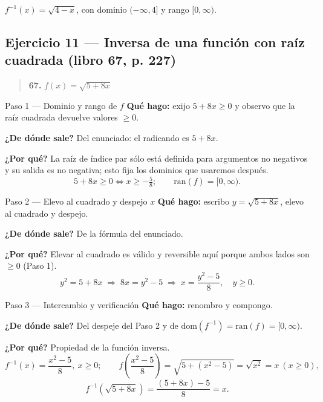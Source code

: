\documentclass[11pt]{article}
\begin{document}
\begin{resp}
$f^{-1}(x)=\sqrt{4-x}$, con dominio $(-\infty,4]$ y rango $[0,\infty)$.
\end{resp}

\subsection*{Ejercicio 11 --- Inversa de una función con raíz cuadrada (libro 67, p. 227)}

\begin{quote}
\textbf{67.} $f(x)=\sqrt{5+8x}$
\end{quote}

\begin{paso}{Paso 1 --- Dominio y rango de $f$}
\textbf{Qué hago:} exijo $5+8x\ge 0$ y observo que la raíz cuadrada devuelve valores $\ge 0$.

\textbf{¿De dónde sale?} Del enunciado: el radicando es $5+8x$.

\textbf{¿Por qué?} La raíz de índice par sólo está definida para argumentos no negativos y su salida es no negativa; esto fija los dominios que usaremos después.
\[
5+8x\ge 0 \iff x\ge -\tfrac{5}{8}; \qquad \text{ran}(f)=[0,\infty).
\]
\end{paso}

\begin{paso}{Paso 2 --- Elevo al cuadrado y despejo $x$}
\textbf{Qué hago:} escribo $y=\sqrt{5+8x}$, elevo al cuadrado y despejo.

\textbf{¿De dónde sale?} De la fórmula del enunciado.

\textbf{¿Por qué?} Elevar al cuadrado es válido y reversible aquí porque ambos lados son $\ge 0$ (Paso 1).
\[
y^2=5+8x \;\Longrightarrow\; 8x=y^2-5 \;\Longrightarrow\; x=\frac{y^2-5}{8}, \quad y\ge 0.
\]
\end{paso}

\begin{paso}{Paso 3 --- Intercambio y verificación}
\textbf{Qué hago:} renombro y compongo.

\textbf{¿De dónde sale?} Del despeje del Paso 2 y de $\text{dom}(f^{-1})=\text{ran}(f)=[0,\infty)$.

\textbf{¿Por qué?} Propiedad de la función inversa.
\[
f^{-1}(x)=\frac{x^2-5}{8}, \ x\ge 0; \qquad
f\!\left(\frac{x^2-5}{8}\right)=\sqrt{5+(x^2-5)}=\sqrt{x^2}=x \ (x\ge0),
\]
\[
f^{-1}\!\left(\sqrt{5+8x}\right)=\frac{(5+8x)-5}{8}=x.
\]
\end{paso}
\end{document}
